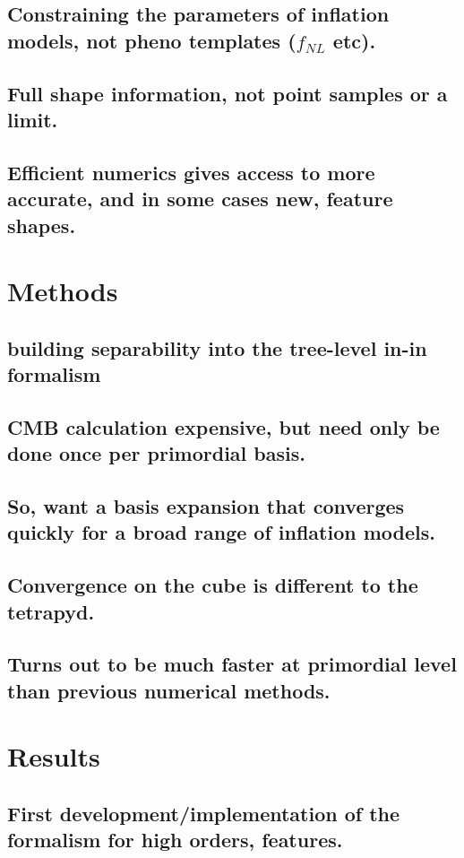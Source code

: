     \subsection{Constraining the parameters of inflation models, not pheno templates ($f_{NL}$ etc).}
    \subsection{Full shape information, not point samples or a limit.}
    \subsection{Efficient numerics gives access to more accurate, and in some cases new, feature shapes.}
\section{Methods}
    \subsection{building separability into the tree-level in-in formalism}
    \subsection{CMB calculation expensive, but need only be done once per primordial basis.}
    \subsection{So, want a basis expansion that converges quickly for a broad range of inflation models.}
    \subsection{Convergence on the cube is different to the tetrapyd.}
    \subsection{Turns out to be much faster at primordial level than previous numerical methods.}
\section{Results}
    \subsection{First development/implementation of the formalism for high orders, features.}
